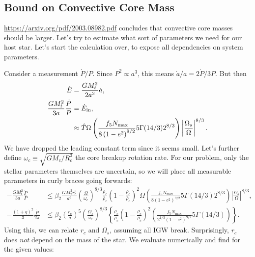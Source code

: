 \documentclass[11pt,
        usenames, %
        dvipsnames %
    ]{article}
\newcommand*{\abs}[1]{\left|#1\right|}
\newcommand*{\p}[1]{\left(#1\right)}
\newcommand*{\z}[1]{\left\{#1\right\}}
\begin{document}
\subsection{Bound on Convective Core Mass}

\url{https://arxiv.org/pdf/2003.08982.pdf} concludes that convective core masses
should be larger. Let's try to estimate what sort of parameters we need for our
host star. Let's start the calculation over, to expose all dependencies on
system parameters.

Consider a measurement $\dot{P} / P$. Since $P^2 \propto a^3$, this means
$\dot{a} / a = 2\dot{P} / 3P$. But then
\begin{align}
    \dot{E} &= \frac{GM_t^2}{2a^2}\dot{a},\\
    \frac{GM_t^2}{3a} \frac{\dot{P}}{P} &= \dot{E}_{\rm in},\\
        &\approx \hat{T}\Omega \p{\frac{f_5 N_{\max}}{8\p{1 - e^2}^{9/2}}
            5\Gamma(14/3)2^{8/3}}\abs{\frac{\Omega_s}{\Omega}}^{8/3}.
\end{align}
We have dropped the leading constant term since it seems small. Let's further
define $\omega_c \equiv \sqrt{GM_c/R_c^3}$ the core breakup rotation rate. For
our problem, only the stellar parameters themselves are uncertain, so we will
place all measurable parameters in curly braces going forwards:
\begin{align}
    -\frac{GM_t^2}{3a}\frac{\dot{P}}{P}
        &\leq \beta_2 \frac{GM_2^2r_c^5}{a^6}
            \p{\frac{\Omega}{\omega_c}}^{8/3} \frac{\rho_c}{\bar{\rho}_c}
                \p{1 - \frac{\rho_c}{\bar{\rho}_c}}^2
            \Omega \p{\frac{f_5 N_{\max}}{8\p{1 - e^2}^{9/2}}
            5\Gamma(14/3)2^{8/3}}\abs{\frac{\Omega_s}{\Omega}}^{8/3},\\
    -\frac{(1 + q)^2}{3} \frac{\dot{P}}{2\pi} &\leq
        \beta_2 \p{\frac{r_c}{a}}^5 \p{\frac{\Omega_s}{\omega_c}}^{8/3}
            \z{\frac{\rho_c}{\bar{\rho_c}}
            \p{1 - \frac{\rho_c}{\bar{\rho}_c}}^2
            \p{\frac{f_5 N_{\max}}{2^{1/3}\p{1 - e^2}^{9/2}}
            5\Gamma(14/3)}}.
\end{align}
Using this, we can relate $r_c$ and $\Omega_s$, assuming all IGW break.
Surprisingly, $r_c$ does \emph{not} depend on the mass of the star. We evaluate
numerically and find for the given values:
\end{document}
